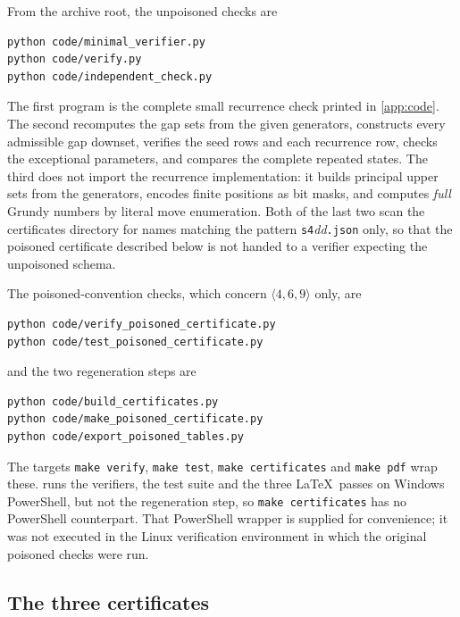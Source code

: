 \documentclass[11pt,letterpaper]{article}
\numberwithin{equation}{section}
\theoremstyle{definition}
\theoremstyle{remark}
\begin{document}
From the archive root, the unpoisoned checks are
\begin{lstlisting}[language={},basicstyle=\small\ttfamily]
python code/minimal_verifier.py
python code/verify.py
python code/independent_check.py
\end{lstlisting}
The first program is the complete small recurrence check printed in
\cref{app:code}. The second recomputes the gap sets from the given
generators, constructs every admissible gap downset, verifies the seed
rows and each recurrence row, checks the exceptional parameters, and
compares the complete repeated states. The third does not import the
recurrence implementation: it builds principal upper sets from the
generators, encodes finite positions as bit masks, and computes
\emph{full} Grundy numbers by literal move enumeration. Both of the last
two scan the certificates directory for names matching the pattern
\texttt{s4}\textit{dd}\texttt{.json} only, so that the poisoned
certificate described below is not handed to a verifier expecting the
unpoisoned schema.

The poisoned-convention checks, which concern $\langle4,6,9\rangle$ only,
are
\begin{lstlisting}[language={},basicstyle=\small\ttfamily]
python code/verify_poisoned_certificate.py
python code/test_poisoned_certificate.py
\end{lstlisting}
and the two regeneration steps are
\begin{lstlisting}[language={},basicstyle=\small\ttfamily]
python code/build_certificates.py
python code/make_poisoned_certificate.py
python code/export_poisoned_tables.py
\end{lstlisting}
The targets \texttt{make verify}, \texttt{make test},
\texttt{make certificates} and \texttt{make pdf} wrap these.
 runs the verifiers, the test suite and the three
\LaTeX\ passes on Windows PowerShell, but not the regeneration step, so
\texttt{make certificates} has no PowerShell counterpart. That
PowerShell wrapper is supplied for convenience; it was not executed in
the Linux verification environment in which the original poisoned checks
were run.

\subsection{The three certificates}
\end{document}
